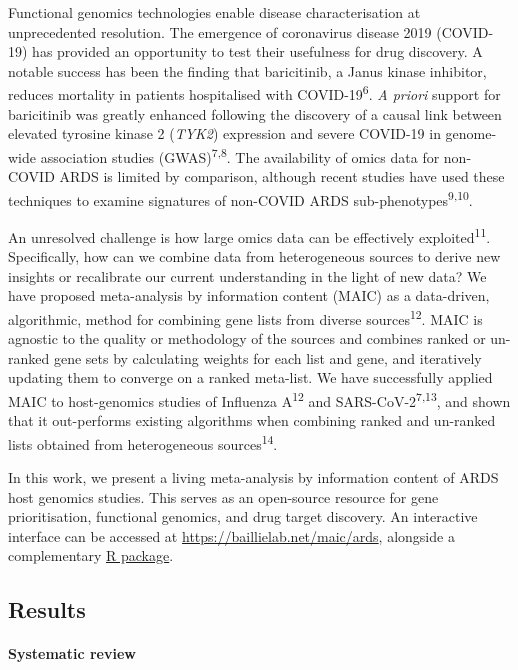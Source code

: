 \documentclass[
  11,
  a4paper,
]{article}
\let\oldparagraph\paragraph
\renewcommand{\paragraph}[1]{\oldparagraph{#1}\mbox{}}
\begin{document}
Functional genomics technologies enable disease characterisation at
unprecedented resolution. The emergence of coronavirus disease 2019
(COVID-19) has provided an opportunity to test their usefulness for drug
discovery. A notable success has been the finding that baricitinib, a
Janus kinase inhibitor, reduces mortality in patients hospitalised with
COVID-19\textsuperscript{6}. \emph{A priori} support for baricitinib was
greatly enhanced following the discovery of a causal link between
elevated tyrosine kinase 2 (\emph{TYK2}) expression and severe COVID-19
in genome-wide association studies (GWAS)\textsuperscript{7,8}. The
availability of omics data for non-COVID ARDS is limited by comparison,
although recent studies have used these techniques to examine signatures
of non-COVID ARDS sub-phenotypes\textsuperscript{9,10}.

An unresolved challenge is how large omics data can be effectively
exploited\textsuperscript{11}. Specifically, how can we combine data
from heterogeneous sources to derive new insights or recalibrate our
current understanding in the light of new data? We have proposed
meta-analysis by information content (MAIC) as a data-driven,
algorithmic, method for combining gene lists from diverse
sources\textsuperscript{12}. MAIC is agnostic to the quality or
methodology of the sources and combines ranked or un-ranked gene sets by
calculating weights for each list and gene, and iteratively updating
them to converge on a ranked meta-list. We have successfully applied
MAIC to host-genomics studies of Influenza A\textsuperscript{12} and
SARS-CoV-2\textsuperscript{7,13}, and shown that it out-performs
existing algorithms when combining ranked and un-ranked lists obtained
from heterogeneous sources\textsuperscript{14}.

In this work, we present a living meta-analysis by information content
of ARDS host genomics studies. This serves as an open-source resource
for gene prioritisation, functional genomics, and drug target discovery.
An interactive interface can be accessed at
\url{https://baillielab.net/maic/ards}, alongside a complementary
\href{https://github.com/baillielab/ARDSMAICr}{R package}.

\newpage

\hypertarget{results}{%
\subsection{Results}\label{results}}

\hypertarget{systematic-review}{%
\paragraph{Systematic review}\label{systematic-review}}
\end{document}
